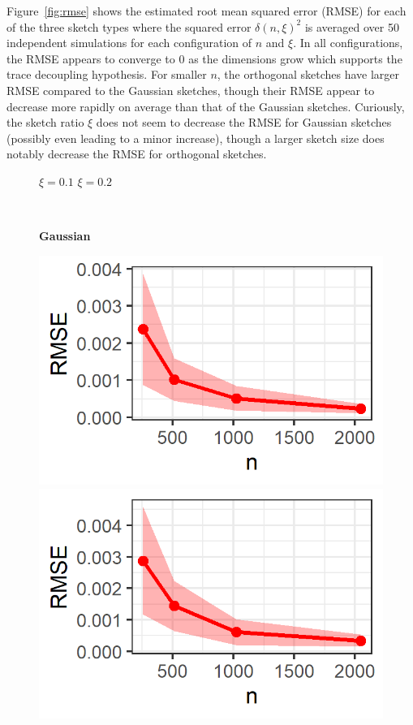 Figure~\ref{fig:rmse} shows the estimated root mean squared error (RMSE) for each of the three sketch types where the squared error $\delta(n,\xi)^2$ is averaged over 50 independent simulations for each configuration of $n$ and $\xi$. In all configurations, the RMSE appears to converge to 0 as the dimensions grow which supports the trace decoupling hypothesis. For smaller $n$, the orthogonal sketches have larger RMSE compared to the \iid Gaussian sketches, though their RMSE appear to decrease more rapidly on average than that of the \iid Gaussian sketches. Curiously, the sketch ratio $\xi$ does not seem to decrease the RMSE for \iid Gaussian sketches (possibly even leading to a minor increase), though a larger sketch size does notably decrease the RMSE for orthogonal sketches.

\begin{figure}[ht]
\centering
\begin{minipage}[c]{0.21\textwidth}
\vspace{2em}
\end{minipage}
\hfill
\begin{minipage}[c]{0.76\textwidth}
\hfill $\xi=0.1$ \qquad\qquad\; \hfill $\xi=0.2$ \qquad\qquad\; \hfill
\end{minipage} \\
\begin{minipage}[c]{0.21\textwidth}
\hfill \textbf{\iid Gaussian}
\end{minipage}
\hfill
\begin{minipage}[c]{0.76\textwidth}
\includegraphics{images/rmse_sketchgaussian_xi0.1.png}
\includegraphics{images/rmse_sketchgaussian_xi0.2.png}

\end{minipage}
\end{figure}
